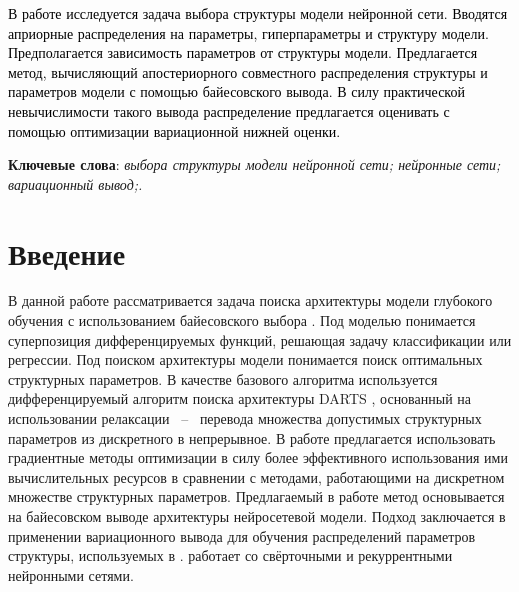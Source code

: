 \documentclass[12pt, twoside]{article}
\begin{document}

    {\textcolor{black}{В работе исследуется задача выбора структуры модели нейронной сети. Вводятся априорные распределения на параметры, гиперпараметры и структуру модели. Предполагается зависимость параметров от структуры модели.  Предлагается метод, вычисляющий апостериорного совместного распределения структуры и параметров модели с помощью байесовского вывода. В силу практической невычислимости такого вывода распределение предлагается оценивать с помощью оптимизации вариационной нижней оценки.}
    

\bigskip
\noindent
\textbf{Ключевые слова}: \emph {выбора структуры модели нейронной сети; нейронные сети; вариационный вывод;.}
}


\section{Введение}
В данной работе рассматривается задача поиска архитектуры модели глубокого обучения с использованием байесовского выбора \cite{NIPS2011_7eb3c8be}. Под моделью понимается суперпозиция дифференцируемых функций, решающая задачу классификации или регрессии. Под поиском архитектуры модели понимается поиск оптимальных структурных параметров. В качестве базового алгоритма используется дифференцируемый алгоритм поиска архитектуры DARTS \cite{DBLP:journals/corr/abs-1806-09055}, основанный на использовании  релаксации ~--~ перевода множества допустимых структурных параметров из дискретного в непрерывное. В работе предлагается использовать градиентные методы оптимизации в силу более эффективного использования ими вычислительных ресурсов в сравнении с методами, работающими на дискретном множестве структурных параметров. Предлагаемый в работе метод основывается на байесовском выводе архитектуры нейросетевой модели. Подход заключается в применении вариационного вывода \cite{NIPS2011_7eb3c8be} для обучения распределений параметров структуры, используемых в \cite{DBLP:journals/corr/abs-1806-09055}. работает со свёрточными и рекуррентными нейронными сетями.
\end{document}
